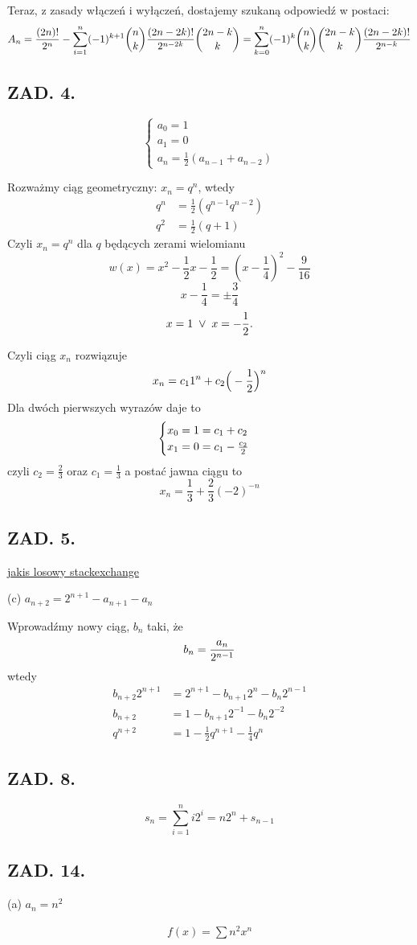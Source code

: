 \documentclass{article}[13pt]
\begin{document}
Teraz, z zasady włączeń i wyłączeń, dostajemy szukaną odpowiedź w postaci:
$$A_{n}={(2n)!\over 2^n}-\sum\limits_{i=1}^n(-1)^{k+1}{n\choose k}{(2n-2k)!\over 2^{n-2k}}{2n-k\choose k}=\sum\limits_{k=0}^n(-1)^k{n\choose k}{2n-k\choose k}{(2n-2k)!\over 2^{n-k}}$$


\subsection*{ZAD. 4.}

$$\begin{cases}
    a_0=1\\
    a_1=0\\
    a_n=\frac12(a_{n-1}+a_{n-2})
\end{cases}$$

Rozważmy ciąg geometryczny: $x_n=q^n$, wtedy
\begin{align*}
    q^n&=\frac12(q^{n-1}q^{n-2})\\
    q^2&=\frac12(q+1)
\end{align*}
Czyli $x_n=q^n$ dla $q$ będących zerami wielomianu
$$w(x)=x^2-\frac12x-\frac12=(x-\frac14)^2-\frac9{16}$$
$$x-\frac14=\pm \frac34$$
$$x=1\;\lor\;x=-{1\over 2}.$$

Czyli ciąg $x_n$ rozwiązuje
$$x_n=c_11^n+c_2\Big(-{1\over 2}\Big)^n$$
Dla dwóch pierwszych wyrazów daje to
\begin{align*}
    \begin{cases}
        x_0=1=c_1+c_2\\
        x_1=0=c_1-{c_2\over2}
    \end{cases}\\
\end{align*}
czyli $c_2=\frac23$ oraz $c_1=\frac13$ a postać jawna ciągu to
$$x_n=\frac13+\frac23(-2)^{-n}$$


\subsection*{ZAD. 5.}

\href{https://math.stackexchange.com/questions/1258484/getting-rid-of-exponents-with-n-when-solving-with-annihilators-a-n-a-n-12a}{jakis losowy stackexchange}

{\color{acc}(c)} $a_{n+2}=2^{n+1}-a_{n+1}-a_n$
\smallskip

Wprowadźmy nowy ciąg, $b_n$ taki, że
$$b_n={a_n\over 2^{n-1}}$$
wtedy
\begin{align*}
    b_{n+2}2^{n+1}&=2^{n+1}-b_{n+1}2^n-b_n2^{n-1}\\
    b_{n+2}&=1-b_{n+1}2^{-1}-b_n2^{-2}\\
    q^{n+2}&=1-\frac12q^{n+1}-\frac14q^{n}
\end{align*}

\subsection*{ZAD. 8.}

$$s_n=\sum\limits_{i=1}^ni2^i=n2^n+s_{n-1}$$

\subsection*{ZAD. 14.}

{\color{acc}(a)} $a_n=n^2$

\begin{align*}
    f(x)=\sum n^2x^n
\end{align*}
\end{document}
